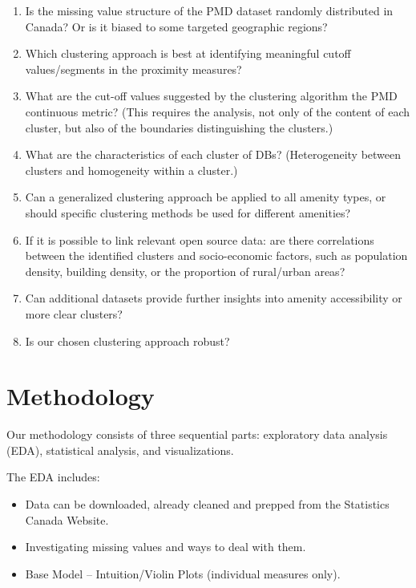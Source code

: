 \documentclass[11pt, a4paper]{article}
\newcommand{\comment}[1]{}
\begin{document}
\begin{enumerate}
\item Is the missing value structure of the PMD dataset randomly distributed in Canada? Or is it biased to some targeted geographic regions? 
\item Which clustering approach is best at identifying meaningful cutoff values/segments in the proximity measures?
\item What are the cut-off values suggested by the clustering algorithm the PMD continuous metric? (This requires the analysis, not only of the content of each cluster, but also of the boundaries distinguishing the clusters.) 
\item What are the characteristics of each cluster of DBs? (Heterogeneity between clusters and homogeneity within a cluster.)
\item Can a generalized clustering approach be applied to all amenity types, or should specific clustering methods be used for different amenities?
\item If it is possible to link relevant open source data: are there correlations between the identified clusters and socio-economic factors, such as population density, building density, or the proportion of rural/urban areas?
\item Can additional datasets provide further insights into amenity accessibility or more clear clusters?
\item Is our chosen clustering approach robust?
\end{enumerate}






\section*{Methodology}

\comment{
\subsection*{Data Investigation}
\subsection*{Statistical Analysis}
\subsection*{Visualization}
}

Our methodology consists of three sequential parts: exploratory data analysis (EDA), statistical analysis, and visualizations.
\par
The EDA includes:
\begin{itemize}
\item Data can be downloaded, already cleaned and prepped from the Statistics Canada Website.
\item Investigating missing values and ways to deal with them.
\item Base Model – Intuition/Violin Plots (individual measures only).
\end{itemize}
\end{document}
